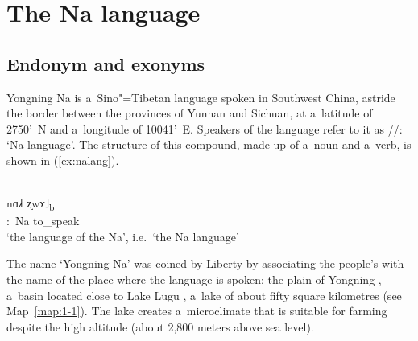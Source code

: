 \section{The Na language}
\label{sec:presentationofthenalanguageandnasocietyandreviewofearlierstudies}


\subsection{Endonym and exonyms}
\label{sec:endoexo}

Yongning Na is a~Sino"={Tibetan} language spoken in Southwest China, astride the border between the provinces of Yunnan and Sichuan, at a~latitude of
27{\textdegree}50’~N and a~longitude of 100{\textdegree}41’~E. Speakers of the language refer to it as //: ‘Na language’. The structure of this {compound}, made up of a~{noun} and a~verb, is shown in (\ref{ex:nalang}).

\begin{exe}
	\ex
	\label{ex:nalang}
	\\
	\gll nɑ˩˧		ʐwɤ˩\textsubscript{b}\\
	:~Na			to\_speak\\
	\glt ‘the language of the Na’, i.e.\ ‘the Na language’
\end{exe}


The name ‘Yongning Na’ was coined by Liberty \citet{lidz2006} by associating the people's  with the name of the place where the language is spoken: 
the plain of Yongning , a~basin located close to Lake Lugu , a~lake of about fifty square kilometres (see Map~\ref{map:1-1}). The lake creates a~microclimate that is suitable for farming despite the high altitude (about 2,800 meters above sea level).

